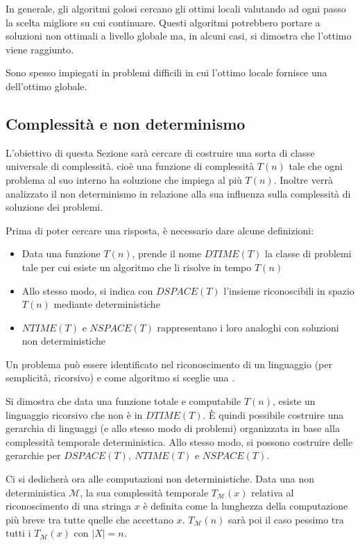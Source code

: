 \documentclass[italian, 10pt]{article}
\begin{document}
In generale, gli algoritmi golosi cercano gli ottimi locali valutando ad ogni passo la scelta migliore su cui continuare.
Questi algoritmi potrebbero portare a soluzioni non ottimali a livello globale ma, in alcuni casi, si dimostra che l'ottimo viene raggiunto.

Sono spesso impiegati in problemi difficili in cui l'ottimo locale fornisce una  dell'ottimo globale.

\subsection{Complessità e non determinismo}

L'obiettivo di questa Sezione sarà cercare di costruire una sorta di classe universale di complessità. cioè una funzione di complessità \(T(n)\) tale che ogni problema al suo interno ha soluzione che impiega al più \(T(n)\).
Inoltre verrà analizzato il non determinismo in relazione alla sua influenza sulla complessità di soluzione dei problemi.

Prima di poter cercare una risposta, è necessario dare alcune definizioni:

\begin{itemize}
  \item Data una funzione \(T(n)\), prende il nome \textbf{\(DTIME(T)\)} la classe di problemi tale per cui esiste un algoritmo che li risolve in tempo \(T(n)\)
  \item Allo stesso modo, si indica con \textbf{\(DSPACE(T)\)} l'insieme riconoscibili in spazio \(T(n)\) mediante \TM deterministiche
  \item \(NTIME(T)\) e \(NSPACE(T)\) rappresentano i loro analoghi con soluzioni non deterministiche
\end{itemize}

Un problema può essere identificato nel riconoscimento di un linguaggio (per semplicità, ricorsivo) e come algoritmo si sceglie una \TM.

\bigskip
Si dimostra che data una funzione totale e computabile \(T(n)\), esiste un linguaggio ricorsivo che non è in \(DTIME(T)\).
È quindi possibile costruire una gerarchia di linguaggi (e allo stesso modo di problemi) organizzata in base alla complessità temporale deterministica.
Allo stesso modo, si possono costruire delle gerarchie per \(DSPACE(T),\ NTIME(T)\) e \(NSPACE(T)\).

\bigskip
Ci si dedicherà ora alle computazioni non deterministiche.
Data una \TM non deterministica \(\mathcal{M}\), la sua complessità temporale \(T_{\mathcal{M}}(x)\) relativa al riconoscimento di una stringa \(x\) è definita come la lunghezza della computazione più breve tra tutte quelle che accettano \(x\).
\(T_{\mathcal{M}}(n)\) sarà poi il caso pessimo tra tutti i \(T_{\mathcal{M}}(x)\) con \(|X| = n\).
\end{document}
